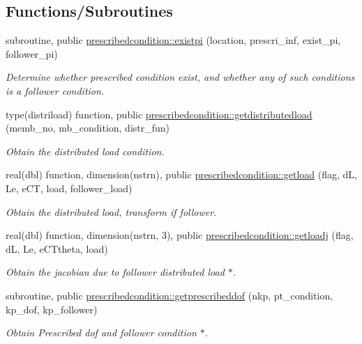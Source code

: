\subsection*{Functions/\+Subroutines}
\begin{DoxyCompactItemize}
\item 
subroutine, public \hyperlink{namespaceprescribedcondition_acb722f1fdcfebc72bc33fb3162d9db6d}{prescribedcondition\+::existpi} (location, prescri\+\_\+inf, exist\+\_\+pi, follower\+\_\+pi)
\begin{DoxyCompactList}\small\item\em Determine whether prescribed condition exist, and whether any of such conditions is a follower condition. \end{DoxyCompactList}\item 
type(distriload) function, public \hyperlink{namespaceprescribedcondition_a3f553c3c92903ed635511b07840774ff}{prescribedcondition\+::getdistributedload} (memb\+\_\+no, mb\+\_\+condition, distr\+\_\+fun)
\begin{DoxyCompactList}\small\item\em Obtain the distributed load condition. \end{DoxyCompactList}\item 
real(dbl) function, dimension(nstrn), public \hyperlink{namespaceprescribedcondition_a6f624d814d4a2927fd9cc778231e6840}{prescribedcondition\+::getload} (flag, dL, Le, e\+CT, load, follower\+\_\+load)
\begin{DoxyCompactList}\small\item\em Obtain the distributed load, transform if follower. \end{DoxyCompactList}\item 
real(dbl) function, dimension(nstrn, 3), public \hyperlink{namespaceprescribedcondition_aa1915c03ae6332a4fa577bcbc8ca2a68}{prescribedcondition\+::getloadj} (flag, dL, Le, e\+C\+Ttheta, load)
\begin{DoxyCompactList}\small\item\em Obtain the jacobian due to follower distributed load $\ast$. \end{DoxyCompactList}\item 
subroutine, public \hyperlink{namespaceprescribedcondition_a88f45dfc44f37db180ed595e112a2a36}{prescribedcondition\+::getprescribeddof} (nkp, pt\+\_\+condition, kp\+\_\+dof, kp\+\_\+follower)
\begin{DoxyCompactList}\small\item\em Obtain Prescribed dof and follower condition $\ast$. \end{DoxyCompactList}\item 

\end{DoxyCompactItemize}
